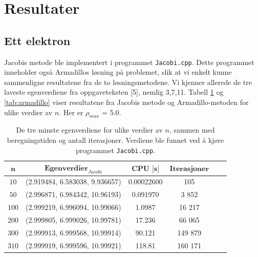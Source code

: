 \documentclass{article}
\begin{document}
\section{Resultater}
\subsection{Ett elektron}
Jacobis metode ble implementert i programmet \texttt{Jacobi.cpp}. Dette programmet inneholder også Armadillos løsning på problemet, slik at vi enkelt kunne sammenligne resultatene fra de to løsningsmetodene. Vi kjenner allerede de tre laveste egenverdiene fra oppgaveteksten [5], nemlig {3,7,11}. Tabell \ref{tab:jacobi} og \ref{tab:armadillo} viser resultatene fra Jacobis metode og Armadillo-metoden for ulike verdier av $n$. Her er $\rho_{max}$ = 5.0.

\FloatBarrier
\begin{table}[!ht]
\centering
\caption{De tre minste egenverdiene for ulike verdier av $n$, sammen med beregningstiden og antall iterasjoner. Verdiene ble funnet ved å kjøre programmet \texttt{Jacobi.cpp}.}
\label{tab:jacobi}
\begin{tabular}{|c|c|c|c|c|c|}
\hline
$\textbf{n}$      &  $\textbf{Egenverdier}_{Jacobi}$ & $\textbf{CPU [s]}$ & $\textbf{Iterasjoner}$ \\ 
\hline
$10$     & (2.919484, 6.583038, 9.936657) &  0.00022600 & 105               \\ 
\hline
$50$ & (2.996871, 6.984342, 10.96193)     & 0.091970     & 3 852             \\ 
\hline
$100$ & (2.999219, 6.996094, 10.99066)     & 1.0987      & 16 217         \\ 
\hline
$200$ & (2.999805, 6.999026, 10.99781)     & 17.236     & 66 065             \\ 
\hline
$300$ & (2.999913, 6.999568, 10.99914)     & 90.121    & 149 879               \\ 
\hline
$310$ & (2.999919, 6.999596, 10.99921)     &  118.81   & 160 171     \\ 
\hline       
\end{tabular}
\end{table}
\FloatBarrier
\end{document}
